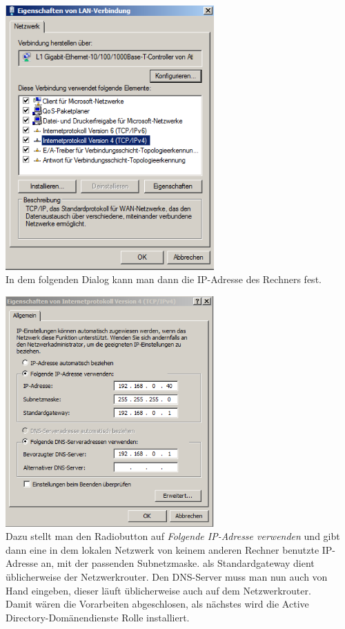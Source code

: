 \documentclass[12pt,a4paper,titlepage]{article} %
\begin{document}
	\includegraphics[width=8cm]{Bilder/004}\\
	
In dem folgenden Dialog kann man dann die IP-Adresse des Rechners fest. 

	\includegraphics[width=8cm]{Bilder/005}\\
	
Dazu stellt man den Radiobutton auf \emph{Folgende IP-Adresse verwenden} und gibt dann eine in dem lokalen Netzwerk von keinem anderen Rechner benutzte IP-Adresse an, mit der passenden Subnetzmaske. als Standardgateway dient üblicherweise der Netzwerkrouter. Den DNS-Server muss man nun auch von Hand eingeben, dieser läuft üblicherweise auch auf dem Netzwerkrouter.\\
Damit wären die Vorarbeiten abgeschlosen, als nächstes wird die Active Directory-Domänendienste Rolle installiert.
\end{document}
